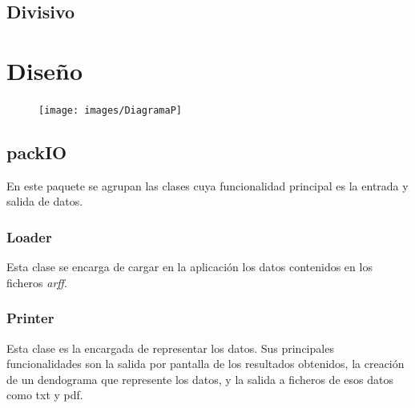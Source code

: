 \documentclass[11pt, titlepage,a4paper]{article}
\begin{document}
\subsection{Divisivo}
\begin{center}

\end{center}

\section{Diseño}
\begin{figure}[hbtp]
\centering
\texttt{[image: images/DiagramaP]}
\end{figure}

\subsection{packIO}
En este paquete se agrupan las clases cuya funcionalidad principal es la entrada
y salida de datos.

\subsubsection{Loader}
Esta clase se encarga de cargar en la aplicación los datos contenidos en los
ficheros \textit{arff}.

\subsubsection{Printer}
Esta clase es la encargada de representar los datos. Sus principales
funcionalidades son la salida por pantalla de los resultados obtenidos, la
creación de un dendograma que represente los datos, y la salida a ficheros de
esos datos como txt y pdf.
\end{document}

